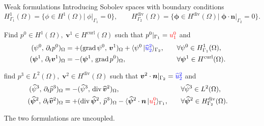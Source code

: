 \documentclass[aspectratio=169]{beamer}
\DeclareMathOperator*{\grad}{grad}
\renewcommand{\div}{\operatorname{div}}
\DeclareMathOperator*{\curl}{curl}
\newcommand{\inpr}[3][]{\ensuremath{( #2, \, #3 )_{#1}}}
\newcommand{\dualpr}[3][]{\ensuremath{\langle #2 \, \vert #3 \rangle_{#1}}}
\newcommand*{\dual}[1]{\ensuremath{\widehat{#1}}}
\begin{document}
	\begin{frame}{Weak formulations}
		Introducing Sobolev spaces with boundary conditions	
		\begin{equation*}
			H^1_{\Gamma_1}(\Omega) = \{\phi \in H^1(\Omega) |\; \phi|_{\Gamma_1} = 0\}, \qquad
			H^{\div}_{\Gamma_2}(\Omega) = \{\bm{\phi} \in H^{\div}(\Omega) |\; \bm{\phi} \cdot \bm{n}|_{\Gamma_2} = 0\}.
		\end{equation*}
		
		
		\begin{tcolorbox}[nobeforeafter, colframe=theme,title=Primal weak formulation]%
			Find $p^0 \in H^1(\Omega), \; \bm{v}^1 \in H^{\curl}(\Omega)$ such that $p^0|_{\Gamma_1} = \textcolor{red}{u^0_1}$ and
			\begin{equation*}
				\begin{aligned}
					\inpr[\Omega]{\psi^0}{\partial_t p^0} &= +\inpr[\Omega]{\grad \psi^0}{\bm{v}^1} + \dualpr[\Gamma_2]{\psi^0}{\textcolor{blue}{\dual{u}^2_2}}, \\
					\inpr[\Omega]{\bm{\psi}^1}{\partial_t \bm{v}^1} &= -\inpr[\Omega]{\bm{\psi}^1}{\grad {p}^0},
				\end{aligned} \qquad
				\begin{aligned}
					&\forall \psi^0 \in H^1_{\Gamma_1}(\Omega), \\
					&\forall \bm{\psi}^1 \in H^{\curl}(\Omega).
				\end{aligned}
			\end{equation*}
		\end{tcolorbox} 
		
		\begin{tcolorbox}[nobeforeafter, colframe=theme,title=Dual weak formulation]%
			find $p^3 \in L^2(\Omega), \; \bm{v}^2 \in H^{\div}(\Omega)$ such that $\bm{v}^2 \cdot \bm{n}|_{\Gamma_2} = \textcolor{blue}{\dual{u}^2_2}$ and
			\begin{equation*}
				\begin{aligned}
					\inpr[\Omega]{\dual{\psi}^3}{\partial_t \dual{p}^3} &= -\inpr[\Omega]{\dual{\psi}^3}{\div\dual{\bm{v}}^2}, \\
					\inpr[\Omega]{\dual{\bm{\psi}}^2}{\partial_t \dual{\bm{v}}^2} &= +\inpr[\Omega]{\div \dual{\bm{\psi}}^2}{\dual{p}^3} - \dualpr[\Gamma_1]{\dual{\bm{\psi}}^2 \cdot \bm{n}}{\textcolor{red}{u^0_1}},
				\end{aligned} \qquad
				\begin{aligned}
					&\forall \dual{\psi}^3 \in L^2(\Omega), \\
					&\forall \dual{\bm{\psi}}^2 \in H^{\div}_{\Gamma_2}(\Omega).
				\end{aligned}
			\end{equation*}
		\end{tcolorbox} 
		The two formulations are uncoupled.
	\end{frame}
	
\end{document}
